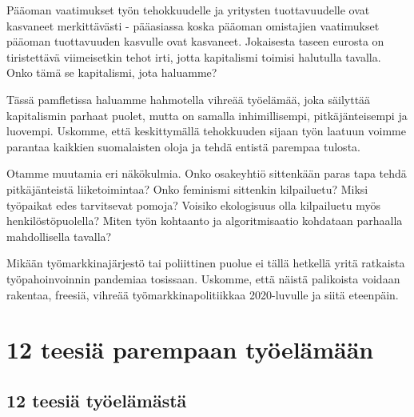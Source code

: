 \documentclass[nobib,finnish,oneside,openany,notoc,a4paper]{tufte-book}
\begin{document}
Pääoman vaatimukset työn tehokkuudelle ja yritysten tuottavuudelle ovat kasvaneet merkittävästi - pääasiassa koska pääoman omistajien vaatimukset pääoman tuottavuuden kasvulle ovat kasvaneet. Jokaisesta taseen eurosta on tiristettävä viimeisetkin tehot irti, jotta kapitalismi toimisi halutulla tavalla. Onko tämä se kapitalismi, jota haluamme?

Tässä pamfletissa haluamme hahmotella vihreää työelämää, joka säilyttää kapitalismin parhaat puolet, mutta on samalla inhimillisempi, pitkäjänteisempi ja luovempi. Uskomme, että keskittymällä tehokkuuden sijaan työn laatuun voimme parantaa kaikkien suomalaisten oloja ja tehdä entistä parempaa tulosta. 

Otamme muutamia eri näkökulmia. Onko osakeyhtiö sittenkään paras tapa tehdä pitkäjänteistä liiketoimintaa? Onko feminismi sittenkin kilpailuetu? Miksi työpaikat edes tarvitsevat pomoja? Voisiko ekologisuus olla kilpailuetu myös henkilöstöpuolella? Miten työn kohtaanto ja algoritmisaatio kohdataan parhaalla mahdollisella tavalla?

Mikään työmarkkinajärjestö tai poliittinen puolue ei tällä hetkellä yritä ratkaista työpahoinvoinnin pandemiaa tosissaan. Uskomme, että näistä palikoista voidaan rakentaa, freesiä, vihreää työmarkkinapolitiikkaa 2020-luvulle ja siitä eteenpäin.

\tableofcontents

\part{12 teesiä parempaan työelämään}

\chapter{12 teesiä työelämästä}
\end{document}
